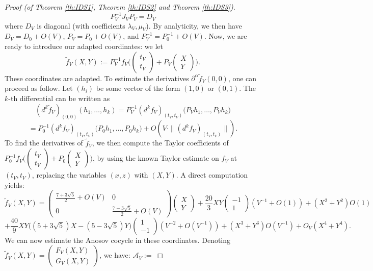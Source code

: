\documentclass[a4paper]{article}
\theoremstyle{definition}
\begin{document}
\begin{proof}[Proof (of Theorem \ref{th:IDS1}, Theorem \ref{th:IDS2} and Theorem \ref{th:IDS3})]
$$ P_V^{-1} J_V P_V = D_V $$
where $D_V$ is diagonal (with coefficients $\lambda_V,\mu_V$). By analyticity, we then have $D_V = D_0 + O(V)$, $P_V=P_0 + O(V)$, and $P_V^{-1} = P_0^{-1} + O(V)$.
Now, we are ready to introduce our adapted coordinates: we let
$$ \tilde{f}_V(X,Y) := P_V^{-1} f_V\Big( \begin{pmatrix} t_V \\ t_V \end{pmatrix} + P_V \begin{pmatrix} X \\ Y \end{pmatrix} \Big). $$
These coordinates are adapted. To estimate the derivatives $\partial^\alpha \tilde{f}_V(0,0)$, one can proceed as follow. Let $(h_i)$ be some vector of the form $(1,0)$ or $(0,1)$. The $k$-th differential can be written as
$$ (d^k \tilde{f}_V)_{(0,0)}(h_1,\dots,h_k) = P_V^{-1} (d^{k}f_V)_{(t_V,t_V)}\Big( P_V h_1, \dots , P_V h_k \Big) $$
$$ = P_0^{-1} (d^{k}f_V)_{(t_V,t_V)}\Big( P_0 h_1, \dots , P_0 h_k \Big) + O(V \cdot \|(d^k f_V)_{(t_V,t_V)}\| ). $$
To find the derivatives of $\tilde{f}_V$, we then compute the Taylor coefficients of \\ $P_0^{-1} f_V\Big( \begin{pmatrix} t_V \\ t_V \end{pmatrix} + P_0 \begin{pmatrix} X \\ Y \end{pmatrix} \Big)$, by using the known Taylor estimate on $f_V$ at $(t_V,t_V)$, replacing the variables $(x,z)$ with $(X,Y)$. A direct computation yields:
$$ \tilde{f}_V(X,Y) = \begin{pmatrix} \frac{7+3\sqrt{5}}{2} + O(V) & 0 \\ 0 &  \frac{7-3\sqrt{5}}{2} + O(V) \end{pmatrix} \begin{pmatrix} X \\ Y \end{pmatrix} + \frac{20}{3} XY \begin{pmatrix} -1 \\ 1 \end{pmatrix} (V^{-1} + O(1)) + (X^2+Y^2) O(1) $$ $$+ \frac{40}{9} X Y \big( (5+3 \sqrt{5})X - (5-3 \sqrt{5})Y \big) \begin{pmatrix} 1 \\ -1 \end{pmatrix} (V^{-2} + O(V^{-1})) + (X^3+Y^3)O(V^{-1}) + O_V(X^4+Y^4) .$$
We can now estimate the Anosov cocycle in these coordinates. Denoting $\tilde{f}_V(X,Y) =  \begin{pmatrix} F_V(X,Y) \\ G_V(X,Y) \end{pmatrix}$, we have: $\mathcal{A}_V :=$ 

\end{proof}
\end{document}
